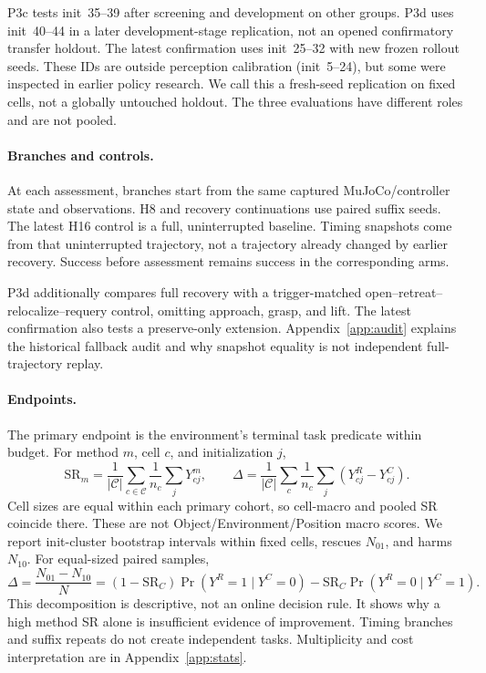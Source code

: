 \documentclass{article}
\begin{document}
P3c tests init~35--39 after screening and development on other groups.
P3d uses init~40--44 in a later development-stage replication, not an
opened confirmatory transfer holdout. The latest confirmation uses init~25--32
with new frozen rollout seeds. These IDs are outside perception calibration
(init~5--24), but some were inspected in earlier policy research.
We call this a fresh-seed replication on fixed cells, not a globally untouched
holdout. The three evaluations have different roles and are not pooled.

\paragraph{Branches and controls.}
At each assessment, branches start from the same captured MuJoCo/controller
state and observations. H8 and recovery continuations use paired suffix seeds.
The latest H16 control is a full, uninterrupted baseline.
Timing snapshots come from that uninterrupted trajectory, not a trajectory
already changed by earlier recovery.
Success before assessment remains success in the corresponding arms.

P3d additionally compares full recovery with a trigger-matched
open--retreat--relocalize--requery control, omitting approach, grasp, and lift.
The latest confirmation also tests a preserve-only extension.
Appendix~\ref{app:audit} explains the historical fallback audit and why
snapshot equality is not independent full-trajectory replay.

\paragraph{Endpoints.}
The primary endpoint is the environment's terminal task predicate within
budget. For method $m$, cell $c$, and initialization $j$,
\begin{equation}
\mathrm{SR}_m=\frac1{|\mathcal C|}\sum_{c\in\mathcal C}
\frac1{n_c}\sum_jY^m_{cj},\qquad
\Delta=\frac1{|\mathcal C|}\sum_c\frac1{n_c}
\sum_j(Y^R_{cj}-Y^C_{cj}).
\label{eq:effect}
\end{equation}
Cell sizes are equal within each primary cohort, so cell-macro and pooled
SR coincide there. These are not Object/Environment/Position macro scores.
We report init-cluster bootstrap intervals within fixed cells,
rescues $N_{01}$, and harms $N_{10}$. For equal-sized paired samples,
\begin{equation}
\Delta=\frac{N_{01}-N_{10}}N
=(1-\mathrm{SR}_C)\Pr(Y^R=1\mid Y^C=0)
-\mathrm{SR}_C\Pr(Y^R=0\mid Y^C=1).
\label{eq:rescue}
\end{equation}
This decomposition is descriptive, not an online decision rule.
It shows why a high method SR alone is insufficient evidence of improvement.
Timing branches and suffix repeats do not create independent tasks.
Multiplicity and cost interpretation are in Appendix~\ref{app:stats}.
\end{document}
